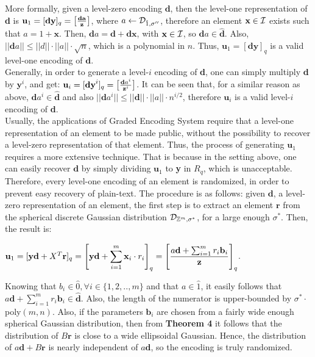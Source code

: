 \begin{enumerate}[label=(\alph*)]
More formally, given a level-zero encoding $\textbf{d}$, then the level-one representation of \textbf{d} is $\textbf{u}_1 = [\textbf{dy}]_q = \big[ \frac{\textbf{\textbf{da}}}{\textbf{z}} \big]$, where $a \leftarrow \mathcal{D}_{\hat{1}, \sigma''}$, therefore an element $\textbf{x} \in \mathcal{I}$ exists such that $a = 1 + \textbf{x}$. Then, $\textbf{d}a = \textbf{d} + \textbf{dx}$, with $\textbf{x} \in \mathcal{I}$, so $\textbf{d}a \in \hat{\textbf{d}}$. Also, $||\textbf{d}a|| \leq ||d|| \cdot ||a|| \cdot \sqrt{n}$, which is a polynomial in $n$. Thus, $\textbf{u}_1 = [\textbf{dy}]_q$ is a valid level-one encoding of $\textbf{d}$. \\

Generally, in order to generate a level-$i$ encoding of \textbf{d}, one can simply multiply \textbf{d} by $\textbf{y}^i$, and get: $\textbf{u}_i = [\textbf{dy}^i]_q = \big[ \frac{\textbf{d}a^i}{\textbf{z}^i} \big]$. It can be seen that, for a similar reason as above, $\textbf{d}a^i \in \hat{\textbf{d}}$ and also $||\textbf{d}a^i|| \leq ||\textbf{d}|| \cdot ||a|| \cdot n^{i/2}$, therefore $\textbf{u}_i$ is a valid level-$i$ encoding of \textbf{d}.\\

Usually, the applications of Graded Encoding System require that a level-one representation of an element to be made public, without the possibility to recover a level-zero representation of that element. Thus, the process of generating $\textbf{u}_1$ requires a more extensive technique. That is because in the setting above, one can easily recover $\textbf{d}$ by simply dividing $\textbf{u}_1$ to \textbf{y} in $R_q$, which is unacceptable. \\

Therefore, every level-one encoding of an element is randomized, in order to prevent easy recovery of plain-text. The procedure is as follows: given $\textbf{d}$, a level-zero representation of an element, the first step is to extract an element $\textbf{r}$ from the spherical discrete Gaussian distribution $\mathcal{D}_{{\mathbb Z}^m, \sigma^*}$, for a large enough $\sigma^*$. Then, the result is:

\begin{center}
	$\textbf{u}_1 = [\textbf{yd} + X^T\textbf{r}]_q = \Bigg[\textbf{yd} + \displaystyle{\sum_{i = 1}^{m} \textbf{x}_i \cdot r_i} \Bigg]_q = \Bigg[ \frac{a\textbf{d} + \sum_{i = 1}^{m} r_i \textbf{b}_i}{\textbf{z}} \Bigg]_q$.
\end{center}

Knowing that $b_i \in \hat{0}, \forall i\in \{1,2,..,m\}$ and that $a \in \hat{1}$, it easily follows that $a\textbf{d} + \sum_{i = 1}^{m} r_i \textbf{b}_i \in \hat{\textbf{d}}$. Also, the length of the numerator is upper-bounded by $\sigma^*\cdot$poly$(m,n)$. Also, if the parameters $\textbf{b}_i$ are chosen from a fairly wide enough spherical Gaussian distribution, then from \textbf{Theorem 4} it follows that the distribution of $B\textbf{r}$ is close to a wide ellipsoidal Gaussian. Hence, the distribution of $a\textbf{d} + B\textbf{r}$ is nearly independent of $a\textbf{d}$, so the encoding is truly randomized. 


\end{enumerate}
